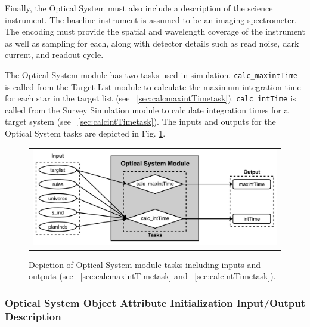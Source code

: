 \documentclass[cleanfoot]{asme2ej}
\begin{document}
Finally, the Optical System must also include a description of the science instrument.  The baseline instrument is assumed to be an imaging spectrometer.  The encoding must provide the spatial and wavelength coverage of the instrument as well as sampling for each, along with detector details such as read noise, dark current, and readout cycle.

The Optical System module has two tasks used in simulation.  \verb+calc_maxintTime+ is called from the Target List module to calculate the maximum integration time for each star in the target list (see ~\ref{sec:calcmaxintTimetask}).  \verb+calc_intTime+ is called from the Survey Simulation module to calculate integration times for a target system (see ~\ref{sec:calcintTimetask}).  The inputs and outputs for the Optical System tasks are depicted in Fig. \ref{fig:opticalsysmodule}.

\begin{figure}[ht]
    \begin{center}
        \begin{tabular}{c}
             \includegraphics[width=\textwidth]{OpticalSysTasks}
        \end{tabular}
    \end{center}
    \caption{\label{fig:opticalsysmodule} Depiction of Optical System module tasks including inputs and outputs (see ~\ref{sec:calcmaxintTimetask} and ~\ref{sec:calcintTimetask}).}
\end{figure}

\label{sec:opticalsystem}
\subsubsection{Optical System Object Attribute Initialization Input/Output Description} 
\end{document}
